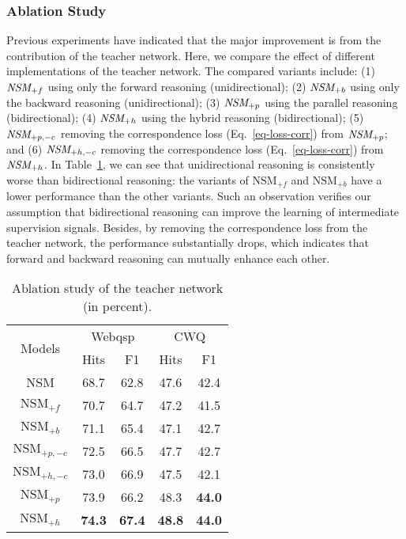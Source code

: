 \subsubsection{Ablation Study}
Previous experiments have indicated that the major improvement is from the contribution of the teacher network. Here, we compare the effect of different implementations of the teacher network. 
The compared variants include: (1) \underline{$\emph{NSM}_{+f}$} using only the forward reasoning (unidirectional); (2)  \underline{$\emph{NSM}_{+b}$} using only the backward reasoning (unidirectional); (3) \underline{$\emph{NSM}_{+p}$} using the parallel reasoning (bidirectional); (4) \underline{$\emph{NSM}_{+h}$} using the hybrid reasoning (bidirectional); (5) \underline{$\emph{NSM}_{+p,-c}$} removing the correspondence loss (Eq.~\ref{eq-loss-corr}) from $\emph{NSM}_{+p}$; and (6) \underline{$\emph{NSM}_{+h,-c}$} removing the correspondence loss (Eq.~\ref{eq-loss-corr}) from $\emph{NSM}_{+h}$.  
In Table~\ref{tab:ablation}, we can see that  unidirectional reasoning is consistently worse than bidirectional reasoning: the variants of $\text{NSM}_{+f}$ and $\text{NSM}_{+b}$ have a lower performance than the other variants. 
Such an observation verifies our assumption that bidirectional reasoning can improve the learning of intermediate supervision signals. 
Besides, by removing the correspondence loss from the teacher network, the performance substantially drops, which indicates that forward and backward reasoning can mutually  enhance each other. 

\begin{table}[htbp]
	\centering
	\caption{Ablation study of the teacher network (in percent).}
	\label{tab:ablation}\begin{tabular}{c c c | c c}
\hline
			\multirow{2}{*}{Models}&\multicolumn{2}{c}{Webqsp}&\multicolumn{2}{c}{CWQ}\\
			\cline{2-5}
			&Hits&F1&Hits&F1\\
			\hline
			NSM	&	68.7& 62.8&47.6&	42.4\\
			\hline
			$\text{NSM}_{+f}$&	70.7& 64.7& 47.2& 41.5\\
			$\text{NSM}_{+b}$&	71.1& 65.4& 47.1& 42.7\\
			$\text{NSM}_{+p,-c}$&	72.5&	66.5& 47.7& 42.7\\
			$\text{NSM}_{+h,-c}$&	73.0& 	66.9& 47.5& 42.1\\
			$\text{NSM}_{+p}$&	73.9& 66.2	&48.3&\textbf{44.0}\\
$\text{NSM}_{+h}$&	\textbf{74.3}& \textbf{67.4}& \textbf{48.8} & \textbf{44.0}\\
			\hline
		\end{tabular}\end{table}

